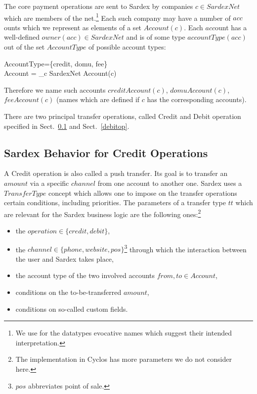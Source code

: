 The core payment operations are sent to Sardex by companies $c \in SardexNet$ which are members of the net.\footnote{We use for the datatypes evocative names which suggest their intended interpretation.} Each such company may have a number of $acc$ounts which we represent as elements of a set $Account(c)$. Each $acc$ount has a well-defined $owner(acc) \in SardexNet$ and is of some type $accountType(acc)$ out of the set $AccountType$ of possible account types:

\begin{asm}
AccountType=\{credit, domu, fee\} \\
Account = \bigcup_{c \in SardexNet} Account(c)
\end{asm}

Therefore we name such accounts 
$creditAccount(c)$, $domuAccount(c)$, $feeAccount(c)$ (names which are defined if $c$ has the corresponding accounts). 

There are two principal transfer operations, called Credit and Debit operation specified in Sect.~\ref{creditop} and Sect.~\ref{debitop}.

\subsection{Sardex Behavior for Credit Operations}
\label{creditop}

A Credit operation is also called a push transfer. Its goal is to transfer an $amount$ via a specific $channel$ from one account to another one. Sardex uses a $TransferType$ concept which allows one to impose on the transfer operations certain conditions, including priorities. The parameters of a transfer type $tt$ which are relevant for the Sardex business logic are the following ones:\footnote{The implementation in Cyclos has more parameters we do not consider here.}

\begin{itemize}
	\item the $operation \in \{credit, debit\}$,
	\item the $channel \in \{phone,website,pos\}$\footnote{$pos$ abbreviates point of sale.} through which the interaction between the user and Sardex takes place,
	\item the account type of the two involved accounts $from,to \in Account$,
	\item conditions on the to-be-transferred $amount$, 
	\item conditions on so-called custom fields.
\end{itemize}

